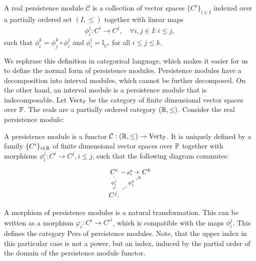 \begin{definition}{\cite[\S 1.1]{chazal2016structure}}
A real persistence module $\mathcal{C}$ is a collection of vector spaces $\{C^i\}_{i \in I}$ indexed over a partially ordered set $(I,\leq)$ together with linear maps
\begin{align}
\phi_{i}^{j}: C^i \rightarrow C^j, \quad \forall i,j \in I: i \leq j,
\end{align}
such that $\phi_{i}^{k} = \phi^{k}_{j} \circ \phi_{i}^{j}$ and $\phi_{i}^i = \mathbb{I}_{C^i}$ for all $i \leq j \leq k$.
\end{definition}

We rephrase this definition in categorical language, which makes it easier for us to define the normal form of persistence modules. Persistence modules have a decomposition into interval modules, which cannot be further decomposed. On the other hand, an interval module is a persistence module that is indecomposable. Let $\operatorname{Vect}_{\mathbb{F}}$ be the category of finite dimensional vector spaces over ${\mathbb{F}}$. The reals are a partially ordered category $({\mathbb{R}}, \leq)$. Consider the real persistence module:

\begin{definition}{\cite[\S 1.3]{chazal2016structure}}
A persistence module is a functor $\mathcal{C}: ({\mathbb{R}},\leq) \rightarrow \operatorname{Vect}_{\mathbb{F}}$. It is uniquely defined by a family $\{C^i\}_{i\in{\mathbb{R}}}$ of finite dimensional vector spaces over ${\mathbb{F}}$ together with morphisms $\phi_{i}^{j}: C^i \rightarrow C^j, i \leq j$, such that the following diagram commutes:
\begin{equation}
\begin{tikzcd}
C^i \arrow[d, "{\phi_{i}^{j}}"' description] \arrow[r, "{\phi_{i}^{k}}" description] & C^k \\
C^j. \arrow[ru, "{\phi_{j}^{k}}" description]                                      &    
\end{tikzcd}
\end{equation}
\end{definition}

\begin{remark}
A morphism of persistence modules is a natural transformation. This can be written as a morphism $\varphi_i: C^i \rightarrow {C'}^i$, which is compatible with the maps $\phi_{i}^{j}$. This defines the category $\mathrm{Pers}$ of persistence modules. Note, that the upper index in this particular case is not a power, but an index, induced by the partial order of the domain of the persistence module functor.
\end{remark}

